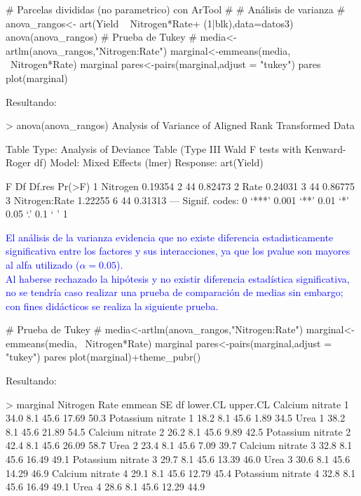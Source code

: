 \documentclass[a4paper,12pt]{article}
\begin{document}
\begin{enumerate}[label=\textbf{\alph*})]
\begin{MyVerbatim}
# Parcelas divididas (no parametrico) con ArTool #
# Análisis de varianza #
anova_rangos<- art(Yield ~ Nitrogen*Rate+ (1|blk),data=datos3)
anova(anova_rangos)
# Prueba de Tukey #
media<-artlm(anova_rangos,"Nitrogen:Rate")
marginal<-emmeans(media, ~Nitrogen*Rate)
marginal
pares<-pairs(marginal,adjust = "tukey")
pares
plot(marginal)
\end{MyVerbatim}
Resultando:
\begin{MyVerbatim}
> anova(anova_rangos)
Analysis of Variance of Aligned Rank Transformed Data

Table Type: Analysis of Deviance Table (Type III Wald F 
tests with Kenward-Roger df) 
Model: Mixed Effects (lmer)
Response: art(Yield)

F Df Df.res  Pr(>F)  
1 Nitrogen      0.19354  2     44 0.82473  
2 Rate          0.24031  3     44 0.86775  
3 Nitrogen:Rate 1.22255  6     44 0.31313  
---
Signif. codes:   0 ‘***’ 0.001 ‘**’ 0.01 ‘*’ 0.05 ‘.’ 0.1 ‘ ’ 1 
\end{MyVerbatim}
\textcolor{blue}{El análisis de la varianza evidencia que no existe diferencia estadisticamente significativa entre los factores y sus interacciones, ya que los pvalue son mayores al alfa utilizado (\(\alpha=0.05\)).\\
Al haberse rechazado la hipótesis y no existir diferencia estadística significativa, no se tendría caso realizar una prueba de comparación de medias
sin embargo; con fines didácticos se realiza la siguiente prueba.}
\begin{MyVerbatim}
# Prueba de Tukey #
media<-artlm(anova_rangos,"Nitrogen:Rate")
marginal<-emmeans(media, ~Nitrogen*Rate)
marginal
pares<-pairs(marginal,adjust = "tukey")
pares
plot(marginal)+theme_pubr()
\end{MyVerbatim}
Resultando:
\begin{MyVerbatim}
> marginal
Nitrogen          Rate emmean  SE   df lower.CL upper.CL
Calcium nitrate   1      34.0 8.1 45.6    17.69     50.3
Potassium nitrate 1      18.2 8.1 45.6     1.89     34.5
Urea              1      38.2 8.1 45.6    21.89     54.5
Calcium nitrate   2      26.2 8.1 45.6     9.89     42.5
Potassium nitrate 2      42.4 8.1 45.6    26.09     58.7
Urea              2      23.4 8.1 45.6     7.09     39.7
Calcium nitrate   3      32.8 8.1 45.6    16.49     49.1
Potassium nitrate 3      29.7 8.1 45.6    13.39     46.0
Urea              3      30.6 8.1 45.6    14.29     46.9
Calcium nitrate   4      29.1 8.1 45.6    12.79     45.4
Potassium nitrate 4      32.8 8.1 45.6    16.49     49.1
Urea              4      28.6 8.1 45.6    12.29     44.9
	

\end{MyVerbatim}
\end{enumerate}
\end{document}
